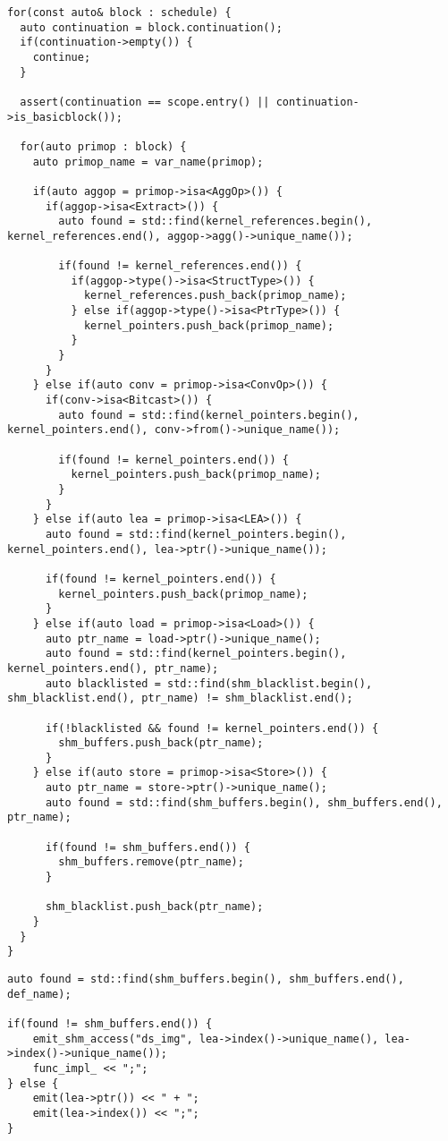 \documentclass{article}
\begin{document}
\begin{verbatim}
for(const auto& block : schedule) {
  auto continuation = block.continuation();
  if(continuation->empty()) {
    continue;
  }

  assert(continuation == scope.entry() || continuation->is_basicblock());

  for(auto primop : block) {
    auto primop_name = var_name(primop);

    if(auto aggop = primop->isa<AggOp>()) {
      if(aggop->isa<Extract>()) {
        auto found = std::find(kernel_references.begin(), kernel_references.end(), aggop->agg()->unique_name());

        if(found != kernel_references.end()) {
          if(aggop->type()->isa<StructType>()) {
            kernel_references.push_back(primop_name);
          } else if(aggop->type()->isa<PtrType>()) {
            kernel_pointers.push_back(primop_name);
          }
        }
      }
    } else if(auto conv = primop->isa<ConvOp>()) {
      if(conv->isa<Bitcast>()) {
        auto found = std::find(kernel_pointers.begin(), kernel_pointers.end(), conv->from()->unique_name());

        if(found != kernel_pointers.end()) {
          kernel_pointers.push_back(primop_name);
        }
      }
    } else if(auto lea = primop->isa<LEA>()) {
      auto found = std::find(kernel_pointers.begin(), kernel_pointers.end(), lea->ptr()->unique_name());

      if(found != kernel_pointers.end()) {
        kernel_pointers.push_back(primop_name);
      }
    } else if(auto load = primop->isa<Load>()) {
      auto ptr_name = load->ptr()->unique_name();
      auto found = std::find(kernel_pointers.begin(), kernel_pointers.end(), ptr_name);
      auto blacklisted = std::find(shm_blacklist.begin(), shm_blacklist.end(), ptr_name) != shm_blacklist.end();

      if(!blacklisted && found != kernel_pointers.end()) {
        shm_buffers.push_back(ptr_name);
      }
    } else if(auto store = primop->isa<Store>()) {
      auto ptr_name = store->ptr()->unique_name();
      auto found = std::find(shm_buffers.begin(), shm_buffers.end(), ptr_name);

      if(found != shm_buffers.end()) {
        shm_buffers.remove(ptr_name);
      }

      shm_blacklist.push_back(ptr_name);
    }
  }
}
\end{verbatim}

\begin{verbatim}
auto found = std::find(shm_buffers.begin(), shm_buffers.end(), def_name);

if(found != shm_buffers.end()) {
    emit_shm_access("ds_img", lea->index()->unique_name(), lea->index()->unique_name());
    func_impl_ << ";";
} else { 
    emit(lea->ptr()) << " + ";
    emit(lea->index()) << ";";
}
\end{verbatim}
\end{document}
